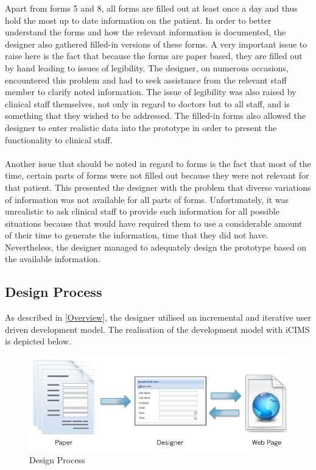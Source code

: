 \noindent Apart from forms 5 and 8, all forms are filled out at least once a day and thus hold the most up to date information on the patient. In order to better understand the forms and how the relevant information is documented, the designer also gathered filled-in versions of these forms. A very important issue to raise here is the fact that because the forms are paper based, they are filled out by hand leading to issues of legibility. The designer, on numerous occasions, encountered this problem and had to seek assistance from the relevant staff member to clarify noted information. The issue of legibility was also raised by clinical staff themselves, not only in regard to doctors but to all staff, and is something that they wished to be addressed. The filled-in forms also allowed the designer to enter realistic data into the prototype in order to present the functionality to clinical staff.
\\ \\
Another issue that should be noted in regard to forms is the fact that most of the time, certain parts of forms were not filled out because they were not relevant for that patient. This presented the designer with the problem that diverse variations of information was not available for all parts of forms. Unfortunately, it was unrealistic to ask clinical staff to provide such information for all possible situations because that would have required them to use a considerable amount of their time to generate the information, time that they did not have. Nevertheless, the designer managed to adequately design the prototype based on the available information.

\subsection{Design Process}
As described in \ref{Overview}, the designer utilised an incremental and iterative user driven development model. The realisation of the development model with iCIMS is depicted below.

\begin{figure}[hp]
				\centering
				\includegraphics[scale=1.0, width=120mm]{Images/Design-Process}
				\caption{Design Process}
\end{figure} 

